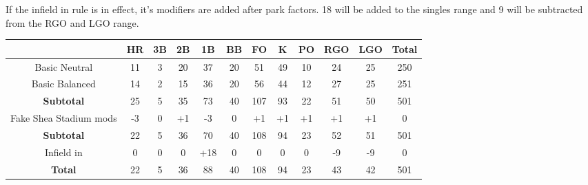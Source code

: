 

If the infield in rule is in effect, it's modifiers are added after park factors. 18 will be added to the singles range and 9 will be subtracted from the RGO and LGO range.

\begin{center}
    \begin{tabular}{|c|c|c|c|c|c|c|c|c|c|c|c|}
		\hline 
		              & HR & 3B & 2B & 1B & BB & FO & K  & PO & RGO & LGO & Total \\
		\hline 
	        	Basic Neutral & 11 & 3  & 20 & 37 & 20 & 51 & 49 & 10 & 24  & 25  & 250   \\
		\hline
		Basic Balanced & 14 & 2  & 15 & 36 & 20 & 56 & 44 & 12 & 27  & 25  & 251   \\
		\hline
		\textbf{Subtotal} & 25 & 5  & 35 & 73 & 40 & 107 & 93 & 22 & 51  & 50  & 501   \\
		\hline \hline
		Fake Shea Stadium mods & -3 & 0 & +1 & -3 & 0 & +1 & +1 & +1 & +1 & +1 & 0 \\
		\hline
		\textbf{Subtotal} & 22 & 5 & 36 & 70 & 40 & 108 & 94 & 23 & 52 & 51 & 501 \\ 
	        	\hline \hline
		Infield in & 0 & 0 & 0 & +18 & 0 & 0 & 0 & 0 & -9 & -9 & 0 \\
		\hline
	        	\textbf{Total}  & 22 & 5  & 36 & 88 & 40 & 108 & 94 & 23 & 43  & 42  & 501   \\
	        	\hline 
    \end{tabular}
\end{center}
